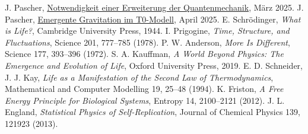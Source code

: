 \documentclass[12pt,a4paper]{article}
\begin{document}
\begin{thebibliography}{99}
		 J. Pascher, \href{https://github.com/jpascher/T0-Time-Mass-Duality/blob/main/2/pdf/Deutsch/NotwendigkeitQMErweiterung.pdf}{Notwendigkeit einer Erweiterung der Quantenmechanik}, März 2025.
		 J. Pascher, \href{https://github.com/jpascher/T0-Time-Mass-Duality/blob/main/2/pdf/Deutsch/EmergentGravT0.pdf}{Emergente Gravitation im T0-Modell}, April 2025.
		 E. Schrödinger, \textit{What is Life?}, Cambridge University Press, 1944.
		 I. Prigogine, \textit{Time, Structure, and Fluctuations}, Science 201, 777--785 (1978).
		 P. W. Anderson, \textit{More Is Different}, Science 177, 393--396 (1972).
		 S. A. Kauffman, \textit{A World Beyond Physics: The Emergence and Evolution of Life}, Oxford University Press, 2019.
		 E. D. Schneider, J. J. Kay, \textit{Life as a Manifestation of the Second Law of Thermodynamics}, Mathematical and Computer Modelling 19, 25--48 (1994).
		 K. Friston, \textit{A Free Energy Principle for Biological Systems}, Entropy 14, 2100--2121 (2012).
		 J. L. England, \textit{Statistical Physics of Self-Replication}, Journal of Chemical Physics 139, 121923 (2013).
	\end{thebibliography}
\end{document}
